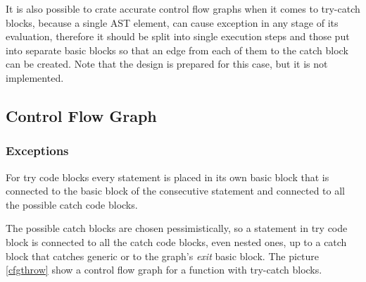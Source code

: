         It is also possible to crate accurate control flow 
        graphs when it comes to try-catch blocks, because a single AST element, 
        can cause exception in any stage of its evaluation, therefore it should 
        be split into single execution steps and those put into separate 
        basic blocks so that an edge from each of them to the 
        catch block can be created. Note that the design is prepared 
        for this case, but it is not implemented.
    
    \subsection{Control Flow Graph}        
        
        \subsubsection*{Exceptions}
        For try code blocks every statement is placed in 
        its own basic block that is connected to the basic block 
        of the consecutive statement and connected to all 
        the possible catch code blocks.
        
        The possible catch blocks are chosen pessimistically, so 
        a statement in try code block is connected to all the 
        catch code blocks, even nested ones, up to a catch block 
        that catches generic  or to the 
        graph's \emph{exit} basic block. The picture \ref{cfgthrow} show 
        a control flow graph for a function with try-catch blocks.
        

